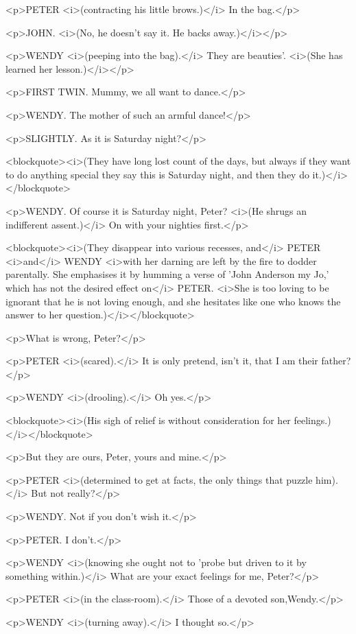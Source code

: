 <p>PETER <i>(contracting his little brows.)</i> In the bag.</p>

<p>JOHN. <i>(No, he doesn't say it. He backs away.)</i></p>

<p>WENDY <i>(peeping into the bag).</i> They are beauties'. <i>(She
has learned her lesson.)</i></p>

<p>FIRST TWIN. Mummy, we all want to dance.</p>

<p>WENDY. The mother of such an armful dance!</p>

<p>SLIGHTLY. As it is Saturday night?</p>

<blockquote><i>(They have long lost count of the days, but always if
they want to do anything special they say this is Saturday night, and
then they do it.)</i></blockquote>

<p>WENDY. Of course it is Saturday night, Peter? <i>(He shrugs an
indifferent assent.)</i> On with your nighties first.</p>

<blockquote><i>(They disappear into various recesses, and</i> PETER
<i>and</i> WENDY <i>with her darning are left by the fire to dodder
parentally. She emphasises it by humming a verse of 'John Anderson my
Jo,' which has not the desired effect on</i> PETER. <i>She is too
loving to be ignorant that he is not loving enough, and she hesitates
like one who knows the answer to her question.)</i></blockquote>

<p>What is wrong, Peter?</p>

<p>PETER <i>(scared).</i> It is only pretend, isn't it, that I am
their father?</p>

<p>WENDY <i>(drooling).</i> Oh yes.</p>

<blockquote><i>(His sigh of relief is without consideration for her
feelings.)</i></blockquote>

<p>But they are ours, Peter, yours and mine.</p>

<p>PETER <i>(determined to get at facts, the only things that puzzle
him).</i> But not really?</p>

<p>WENDY. Not if you don't wish it.</p>

<p>PETER. I don't.</p>

<p>WENDY <i>(knowing she ought not to 'probe but driven to it by
something within.)</i> What are your exact feelings for me,
Peter?</p>

<p>PETER <i>(in the class-room).</i> Those of a devoted
son,Wendy.</p>

<p>WENDY <i>(turning away).</i> I thought so.</p>

